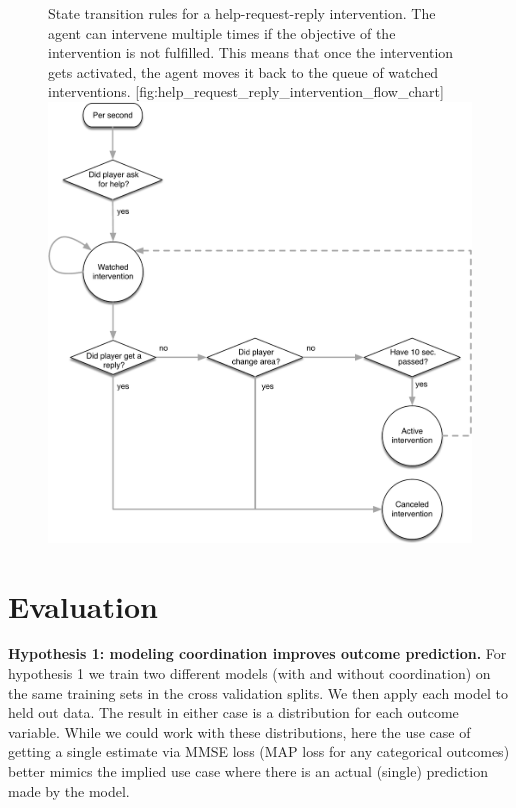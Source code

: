 %
\begin{figure}
    \begin{sidecaption}{%
        State transition rules for a help-request-reply intervention.
        The agent can intervene multiple times if the objective of the
        intervention is not fulfilled. This means that once the intervention
        gets activated, the agent moves it back to the queue of watched
        interventions.
    }[fig:help_request_reply_intervention_flow_chart]
    \includegraphics[width=\textwidth]{../images/help_request_reply_intervention_flow_chart.pdf}
    \end{sidecaption}
\end{figure}
%

\section{Evaluation}

\textbf{Hypothesis 1: modeling coordination improves outcome prediction.}  For
hypothesis 1 we train two different models (with and without coordination) on
the same training sets in the cross validation splits. We then apply each model
to held out data. The result in either case is a distribution for each outcome
variable. While we could work with these distributions, here the use case of
getting a single estimate via MMSE loss (MAP loss for any categorical outcomes)
better mimics the implied use case where there is an actual (single) prediction
made by the model.

